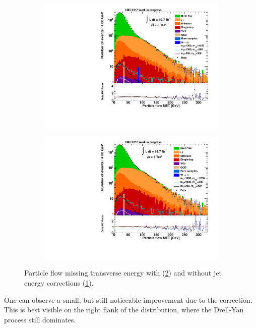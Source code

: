 \begin{figure}[htb!]
  \centering
  \begin{subfigure}[b]{0.495\textwidth}
    \centering
    \includegraphics[width=\textwidth]{plots/pfmet_nojer.pdf}
    \caption{\label{fig:jerpfmet_nojer}}
  \end{subfigure}
  \begin{subfigure}[b]{0.495\textwidth}
    \centering
    \includegraphics[width=\textwidth]{plots/pfmet.pdf}
    \caption{\label{fig:jerpfmet}}
  \end{subfigure}
  \caption{Particle flow missing transverse energy with (\ref{fig:jerpfmet}) and without jet energy corrections (\ref{fig:jerpfmet_nojer}).}
  \label{fig:jermet}
\end{figure}

\noindent One can observe a small, but still noticeable improvement due to the correction. This is best visible on the right flank of the distribution, where the Drell-Yan process still dominates. 


